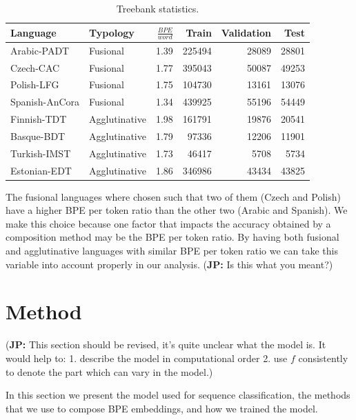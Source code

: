 \documentclass[11pt]{article}
\newcommand\jp[1]{(\textbf{JP:} #1)}
\begin{document}
    	\begin{table} %
		\centering
		\begin{tabular}{l|lrrrr}
			Language & Typology & $\frac{BPE}{word}$ & Train & Validation & Test \\
			\hline
			Arabic-PADT  & Fusional & 1.39 & 225494 & 28089 & 28801  \\
			Czech-CAC   & Fusional & 1.77 & 395043 & 50087 & 49253 \\
			Polish-LFG & Fusional & 1.75 & 104730 & 13161 & 13076 \\
			Spanish-AnCora & Fusional & 1.34 & 439925 & 55196 & 54449 \\
			Finnish-TDT & Agglutinative & 1.98 & 161791 & 19876 & 20541 \\
			Basque-BDT  & Agglutinative & 1.79 & 97336 & 12206 & 11901 \\
			Turkish-IMST & Agglutinative & 1.73 & 46417 & 5708 & 5734 \\
			Estonian-EDT & Agglutinative & 1.86 & 346986 & 43434 & 43825 \\
		\end{tabular}
		\caption{\label{tab:data} Treebank statistics.}
	\end{table}
    
        The fusional languages where chosen such that two of them
        (Czech and Polish) have a higher BPE per token ratio than the
        other two (Arabic and Spanish). We make this choice because
        one factor that impacts the accuracy obtained by a composition
        method may be the BPE per token ratio.  By having both
        fusional and agglutinative languages with similar BPE per
        token ratio we can take this variable into account properly in
        our analysis. \jp{Is this what you meant?}

	\section{Method}
	\label{method}
        \jp{This section should be revised, it's quite unclear what
          the model is. It would help to: 1. describe the model in
          computational order 2. use $f$ consistently to denote the
          part which can vary in the model.}
        
	In this section we present the model used for sequence
        classification, the methods that we use to compose BPE
        embeddings, and how we trained the model.
	
\end{document}
